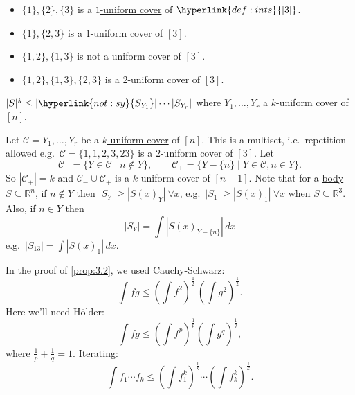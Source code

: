 \documentclass{article}
\newcommand{\named}[1]{\textbf{#1}\index{#1}}
\begin{document}

\begin{eg}\leavevmode
  \begin{itemize}[label=--]
    \item $\{1\},\{2\},\{3\}$ is a \hyperlink{def:cover}{$1$-uniform cover} of $\hyperlink{def:ints}{[3]}$.
    \item $\{1\},\{2,3\}$ is a $1$-uniform cover of $[3]$.
    \item $\{1,2\},\{1,3\}$ is not a uniform cover of $[3]$.
    \item $\{1,2\},\{1,3\}, \{2,3\}$ is a $2$-uniform cover of $[3]$.
  \end{itemize}
\end{eg}
\begin{aim}
  $|S|^k \leq |\hyperlink{not:sy}{S_{Y_1}}| \dotsb |S_{Y_r}|$ where $Y_1, \dotsc, Y_r$ a \hyperlink{def:cover}{$k$-uniform cover} of $[n]$.
\end{aim}
Let $\mathcal{C} = {Y_1, \dotsc, Y_r}$ be a \hyperlink{def:cover}{$k$-uniform cover} of $[n]$.
This is a multiset, i.e.\ repetition allowed e.g.\ $\mathcal{C} = \{1,1,2,3,23\}$ is a $2$-uniform cover of $[3]$.
Let
\begin{equation*}
  \mathcal{C}_- = \{Y \in \mathcal{C} \mid n \notin Y\}, \qquad \mathcal{C}_+ = \{Y - \{n\} \mid Y \in \mathcal{C}, n \in Y\}.
\end{equation*}
So $|\mathcal{C}_+| = k$ and $\mathcal{C}_- \cup \mathcal{C}_+$ is a $k$-uniform cover of $[n-1]$.
Note that for a \hyperlink{def:body}{body} $S \subseteq \mathbb{R}^n$, if $n \notin Y$ then $|S_Y| \geq |S(x)_Y|\ \forall x$, e.g.\ $|S_1| \geq |S(x)_1|\ \forall x$ when $S \subseteq \mathbb{R}^3$.
Also, if $n \in Y$ then
\begin{equation*}
  |S_Y| = \int \left|S(x)_{Y-\{n\}}\right| \, dx
\end{equation*}
e.g.\ $|S_{13}| = \int |S(x)_1| \, dx.$

In the proof of \cref{prop:3.2}, we used Cauchy-Schwarz:
\begin{equation*}\int\!fg \leq \left(\int\!f^2\right)^\frac{1}{2}\, \left(\int\!g^2\right)^{\frac{1}{2}}.\end{equation*}
Here we'll need H\"older:
\begin{equation*}\int\!fg \leq \left(\int\!f^p\right)^\frac{1}{p} \left(\int\!g^q\right)^\frac{1}{q},\end{equation*}
where $\frac{1}{p} + \frac{1}{q} = 1$.
Iterating:
\begin{equation*}\int f_1 \dotsm f_k \leq \left(\int\!f_1^k\right)^\frac{1}{k} \dotsm \left(\int\!f_k^k\right)^\frac{1}{k}.\end{equation*}
\end{document}
